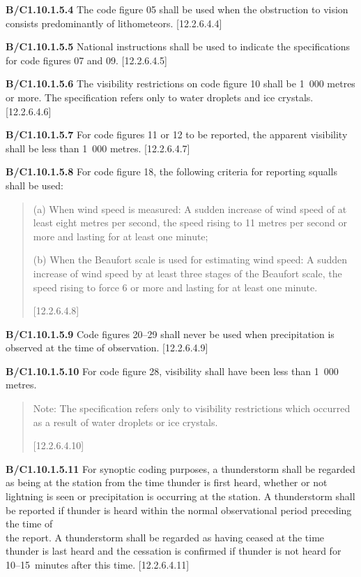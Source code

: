 \textbf{B/C1.10.1.5.4} The code figure 05 shall be used when the obstruction to vision consists predominantly of lithometeors. {[}12.2.6.4.4{]}

\textbf{B/C1.10.1.5.5} National instructions shall be used to indicate the specifications for code figures 07 and 09. {[}12.2.6.4.5{]}

\textbf{B/C1.10.1.5.6} The visibility restrictions on code figure 10 shall be 1~000 metres or more. The specification refers only to water droplets and ice crystals. {[}12.2.6.4.6{]}

\textbf{B/C1.10.1.5.7} For code figures 11 or 12 to be reported, the apparent visibility shall be less than 1~000 metres. {[}12.2.6.4.7{]}

\textbf{B/C1.10.1.5.8} For code figure 18, the following criteria for reporting squalls shall be used:

\begin{quote}
(a) When wind speed is measured: A sudden increase of wind speed of at least eight metres per second, the speed rising to 11 metres per second or more and lasting for at least one minute;

(b) When the Beaufort scale is used for estimating wind speed: A sudden increase of wind speed by at least three stages of the Beaufort scale, the speed rising to force 6 or more and lasting for at least one minute.

{[}12.2.6.4.8{]}
\end{quote}

\textbf{B/C1.10.1.5.9} Code figures 20--29 shall never be used when precipitation is observed at the time of observation. {[}12.2.6.4.9{]}

\textbf{B/C1.10.1.5.10} For code figure 28, visibility shall have been less than 1~000 metres.

\begin{quote}
Note: The specification refers only to visibility restrictions which occurred as a result of water droplets or ice crystals.

{[}12.2.6.4.10{]}
\end{quote}

\textbf{B/C1.10.1.5.11} For synoptic coding purposes, a thunderstorm shall be regarded as being at the station from the time thunder is first heard, whether or not lightning is seen or precipitation is occurring at the station. A thunderstorm shall be reported if thunder is heard within the normal observational period preceding the time of\\
the report. A thunderstorm shall be regarded as having ceased at the time thunder is last heard and the cessation is confirmed if thunder is not heard for 10--15~minutes after this time. {[}12.2.6.4.11{]}

